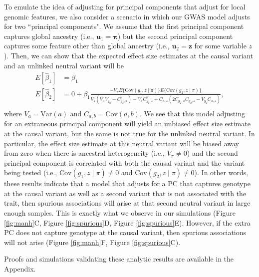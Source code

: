 \documentclass[12pt]{article}
\newcommand{\add}[1]{{\color{red}{[... #1 ...]}}}
\begin{document}
To emulate the idea of adjusting for principal components that adjust for local genomic features, we also consider a scenario in which our GWAS model adjusts for two ``principal components".
We assume that the first principal component captures global ancestry (i.e., $\mathbf{u}_1 = \boldsymbol\pi$) but the second principal component captures some feature other than global ancestry (i.e., $\mathbf{u}_2 = \mathbf{z}$ for some variable $z$).
Then, we can show that the expected effect size estimates at the causal variant and an unlinked neutral variant will be
$$
\begin{aligned}
E[\hat\beta_1] & = \beta_1 \\
E[\hat\beta_2] & = 0 + \beta_1 \frac{-V_\pi E\{\text{Cov}(g_1, z \mid \pi)\} E\{\text{Cov}(g_2, z \mid \pi)\}}{V_z(V_\pi V_{g_2} - C_{g_2,\pi}^2) - V_\pi C_{g_2,z}^2 + C_{\pi, z}(2C_{g_2,\pi} C_{g_2,z} - V_{g_2}C_{\pi,z})}, \\
\end{aligned}
$$
where $V_a = \text{Var}(a)$ and $C_{a,b} = \text{Cov}(a,b)$.
We see that this model adjusting for an extraneous principal component will yield an unbiased effect size estimate at the causal variant, but the same is not true for the unlinked neutral variant.
In particular, the effect size estimate at this neutral variant will be biased away from zero when there is  ancestral heterogeneity (i.e., $V_\pi \neq 0$) and the second principal component is correlated with both the causal variant and the variant being tested (i.e., $\text{Cov}(g_1, z \mid \pi) \neq 0$ and $\text{Cov}(g_2, z \mid \pi) \neq 0$).
In other words, these results indicate that a model that adjusts for a PC that captures genotype at the causal variant as well as a second variant that is not associated with the trait, then spurious associations will arise at that second neutral variant in large enough samples.
This is exactly what we observe in our simulations (Figure \ref{fig:manh}C, Figure \ref{fig:spurious}D,  Figure \ref{fig:spurious}E).
However, if the extra PC does not capture genotype at the causal variant, then spurious associations will not arise (Figure \ref{fig:manh}F, Figure \ref{fig:spurious}C).

% 
Proofs and simulations validating these analytic results are available in the Appendix.


\end{document}
